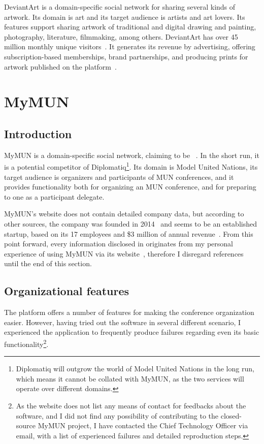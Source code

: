 DeviantArt is a domain-specific social network for sharing several kinds of artwork. Its domain is art and its target audience is artists and art lovers. Its features support sharing artwork of traditional and digital drawing and painting, photography, literature, filmmaking, among others. DeviantArt has over 45 million monthly unique visitors~\cite{about-deviantart}. It generates its revenue by advertising, offering subscription-based memberships, brand partnerships, and producing prints for artwork published on the platform~\cite{deviantart-revenue}.

\section{MyMUN}
\label{section:mymun}

\subsection{Introduction}

MyMUN is a domain-specific social network, claiming to be ~\cite{mymunwebsite}. In the short run, it is a potential competitor of Diplomatiq\footnote{Diplomatiq will outgrow the world of Model United Nations in the long run, which means it cannot be collated with MyMUN, as the two services will operate over different domains.}. Its domain is Model United Nations, its target audience is organizers and participants of MUN conferences, and it provides functionality both for organizing an MUN conference, and for preparing to one as a participant delegate.

MyMUN's website does not contain detailed company data, but according to other sources, the company was founded in 2014~\cite{mymunfacebook} and seems to be an established startup, based on its 17 employees and \$3 million of annual revenue~\cite{mymunzoominfo}. From this point forward, every information disclosed in  originates from my personal experience of using MyMUN via its website~\cite{mymunwebsite}, therefore I disregard references until the end of this section.

\subsection{Organizational features}

The platform offers a number of features for making the conference organization easier. However, having tried out the software in several different scenario, I experienced the application to frequently produce failures regarding even its basic functionality\footnote{As the website does not list any means of contact for feedbacks about the software, and I did not find any possibility of contributing to the closed-source MyMUN project, I have contacted the Chief Technology Officer via email, with a list of experienced failures and detailed reproduction steps.}.

